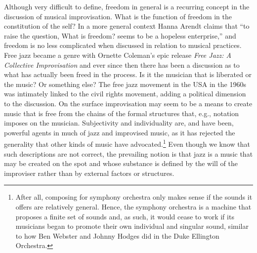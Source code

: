 \documentclass[a4paper]{article}
\begin{document}
Although very difficult to define, freedom in general is a recurring concept in the discussion of musical improvisation. What is the function of freedom in the constitution of the self?  In a more general context Hanna Arendt claims that ``to raise the question, What is freedom?  seems to be a hopeless enterprise,'' \autocite[143]{arendt77} and freedom is no less complicated when discussed in relation to musical practices. Free jazz became a genre with Ornette Coleman’s epic release \emph{Free Jazz: A Collective Improvisation} \autocite{coleman60} and ever since then there has been a discussion as to what has actually been freed in the process. Is it the musician that is liberated or the music?  Or something else?  The free jazz movement in the USA in the 1960s was intimately linked to the civil rights movement, adding a political dimension to the discussion. On the surface improvisation may seem to be a means to create music that is free from the chains of the formal structures that, e.g., notation imposes on the musician. Subjectivity and individuality are, and have been, powerful agents in much of jazz and improvised music, as it has rejected the generality that other kinds of music have advocated.\footnote{After all, composing for symphony orchestra only makes sense if the sounds it offers are relatively general. Hence, the symphony orchestra is a machine that proposes a finite set of sounds and, as such, it would cease to work if its musicians began to promote their own individual and singular sound, similar to how Ben Webster and Johnny Hodges did in the Duke Ellington Orchestra.} Even though we know that such descriptions are not correct, the prevailing notion is that jazz is a music that may be created on the spot and whose substance is defined by the will of the improviser rather than by external factors or structures.

\end{document}
